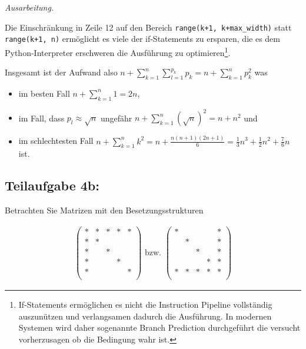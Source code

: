 \documentclass[]{article}
\newenvironment{ausarbeitung}{\vspace{3mm}\noindent\textit{Ausarbeitung.}}{}
\begin{document}
\begin{ausarbeitung}
\begin{itemize}
		Die Einschränkung in Zeile 12 auf den Bereich \texttt{range(k+1, k+max\_width)} statt \texttt{range(k+1, n)} ermöglicht es viele der if-Statements zu ersparen, die es dem Python-Interpreter erschweren die Ausführung zu optimieren\footnote{If-Statements ermöglichen es nicht die Instruction Pipeline vollständig auszunützen und verlangsamen dadurch die Ausführung. In modernen Systemen wird daher sogenannte Branch Prediction durchgeführt die versucht vorherzusagen ob die Bedingung wahr ist.}.
		
		Insgesamt ist der Aufwand also $n + \sum_{k=1}^{n} \sum_{l=1}^{p_k}p_k = n + \sum_{k=1}^{n} p_k^2$ was  
		\begin{itemize}
			\item im besten Fall $n + \sum_{k=1}^{n} 1 = 2n$,
			\item im Fall, dass $p_l \approx \sqrt{n}$ ungefähr $n + \sum_{k=1}^{n}(\sqrt{n})^2 = n + n^2$ und
			\item im schlechtesten Fall $n + \sum_{k=1}^{n}k^2 = n + \frac{n(n+1)(2n+1)}{6} = \frac{1}{3}n^3 + \frac{1}{2}n^2 + \frac{7}{6}n$ ist.
		\end{itemize}
	\end{itemize}
	
\end{ausarbeitung}


\subsection*{Teilaufgabe 4b:}
Betrachten Sie Matrizen mit den Besetzungsstrukturen

\begin{align*}
	\begin{pmatrix}
		* & * & * & * & *\\
		* & * &   &   &  \\
		* &   & * &   &  \\
		* &   &   & * &  \\
		* &   &   &   & *\\
	\end{pmatrix}
	\text{ bzw. }
	\begin{pmatrix}
	* &   &   &   & *\\
	  & * &   &   & *\\
	  &   & * &   & *\\
	  &   &   & * & *\\
	* & * & * & * & *\\
\end{pmatrix}
\end{align*}
\end{document}
